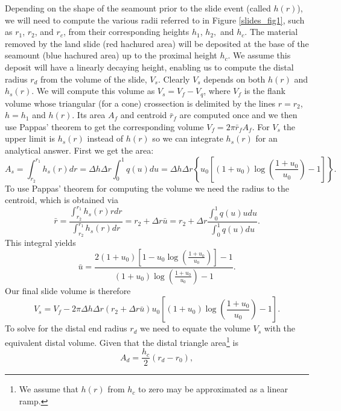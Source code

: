 \documentclass[12pt,letterpaper,margin=0.5in]{report}
\begin{document}
Depending on the shape of the seamount prior to the slide event (called $h(r)$), we will need to compute the various radii referred
to in Figure \ref{slides_fig1}, such as $r_1$, $r_2$, and $r_c$, from their corresponding heights $h_1$, $h_2, $ and $h_c$.
The material removed by the land slide (red hachured area)
will be deposited at the base of the seamount (blue hachured area) up to the proximal height $h_c$.  We assume this deposit will have a linearly
decaying height, enabling us to compute the distal radius $r_d$ from the volume of the slide, $V_s$.  Clearly $V_s$ depends
on both $h(r)$ and $h_s(r)$.  We will compute this volume as $V_s = V_f - V_q$, where $V_f$ is the flank volume whose
triangular (for a cone) crossection is delimited by the lines $r = r_2$, $h = h_1$ and $h(r)$.  Its area $A_f$ and centroid $\bar{r}_f$ are computed once and
we then use Pappas' theorem to get the corresponding volume $V_f = 2 \pi \bar{r}_f A_f$.  For $V_s$ the upper limit is $h_s(r)$ instead of $h(r)$ so we can integrate
$h_s(r)$ for an analytical answer. First we get the area:
\begin{equation}
A_s = \int_{r_2}^{r_1} h_s(r) dr = \Delta h \Delta r \int_0^1 q(u) du = \Delta h \Delta r \left \{ u_0 \left [ (1 + u_0) \log \left (\frac{1 + u_0}{u_0} \right ) - 1 \right ] \right \}.
\end{equation}
To use Pappas' theorem for computing the volume we need the radius to the centroid, which is obtained via
\begin{equation}
\bar{r} = \frac{\int_{r_2}^{r_1}h_s(r)rdr}{\int_{r_2}^{r_1}h_s(r)dr} = r_2 + \Delta r \bar{u} = r_2 + \Delta r \frac{\int_0^1q(u)udu}{\int_0^1 q(u)du}.
\end{equation}
This integral yields
\begin{equation}
\bar{u} = \frac{2(1 + u_0)\left [1 - u_0 \log \left ( \frac{1+u_0}{u_0} \right ) \right ] - 1}{(1 + u_0) \log \left (\frac{1 + u_0}{u_0} \right ) - 1}.
\end{equation}
Our final slide volume is therefore
\begin{equation}
V_s = V_f - 2 \pi \Delta h \Delta r \left ( r_2 + \Delta r\bar{u} \right ) u_0 \left [ (1 + u_0) \log \left (\frac{1 + u_0}{u_0} \right ) - 1 \right ].
\end{equation}
To solve for the distal end radius $r_d$ we need to equate the volume $V_s$ with the equivalent distal volume.
Given that the distal triangle area\footnote{We assume that $h(r)$ from $h_c$ to zero may be approximated as a linear ramp.} is
\begin{equation}
A_d = \frac{h_c}{2} (r_d - r_0),
\end{equation}
\end{document}
